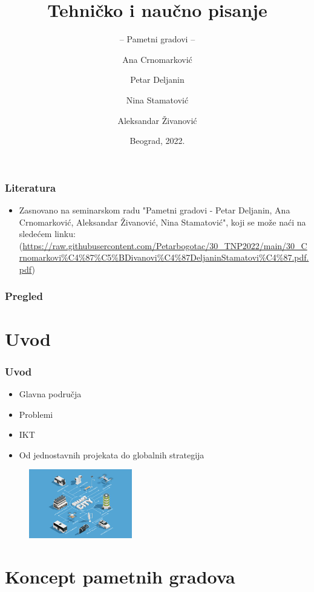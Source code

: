 \documentclass{beamer}
\title{Tehničko i naučno pisanje}
\subtitle{-- Pametni gradovi --}
\author{Ana Crnomarković \and Petar Deljanin\\ \and Nina Stamatović \and Aleksandar Živanović}
\institute{Matematički fakultet\\Univerzitet u Beogradu}
\date{
	\footnotesize{Beograd, 2022.}	
}
\begin{document}
\begin{frame}
	\thispagestyle{empty}
	\titlepage
\end{frame}

\addtocounter{framenumber}{-1}

\begin{frame}[fragile]\frametitle{Literatura}
	\begin{itemize}
		\item Zasnovano na seminarskom radu "Pametni gradovi - Petar Deljanin, Ana Crnomarković, Aleksandar Živanović, Nina Stamatović", koji se može naći na sledećem linku:
		(\url{https://raw.githubusercontent.com/Petarbogotac/30_TNP2022/main/30_Crnomarkovi%C4%87%C5%BDivanovi%C4%87DeljaninStamatovi%C4%87.pdf.pdf})
	\end{itemize}
\end{frame}
\begin{frame}
	\frametitle{Pregled} %
	\tableofcontents[] 
\end{frame}
\section{Uvod}

\begin{frame}[fragile]\frametitle{Uvod}
	\begin{itemize}	
		  \item{Glavna područja}
           \item{Problemi}
           \item{IKT}
           \item{Od jednostavnih projekata do globalnih strategija}
	\end{itemize}
 \begin{figure}[h!]
        \centering\includegraphics[height=3cm]{abt-img.jpg} 
\end{figure}
 
\end{frame}

\section{Koncept pametnih gradova}
\end{document}

